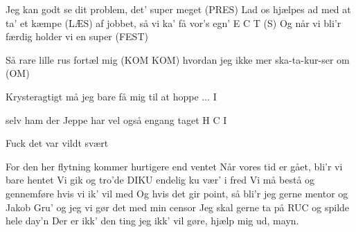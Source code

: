 \documentclass[a4paper,11pt]{article}
\begin{document}
\begin{song}
 Jeg kan godt se dit problem, det' super meget (PRES)
Lad os hjælpes ad med at ta' et kæmpe (LÆS)
af jobbet, så vi ka' få vor's egn' E C T (S)
Og når vi bli'r færdig holder vi en super (FEST)

 Så rare lille rus fortæl mig (KOM KOM)
hvordan jeg ikke mer ska-ta-kur-ser om (OM)

Krysteragtigt må jeg bare få mig til at hoppe ... I %

selv ham der Jeppe har vel også engang taget H C I

Fuck det var vildt svært

 For den her flytning kommer hurtigere end ventet
Når vores tid er gået, bli'r vi bare hentet
Vi gik og tro'de DIKU endelig ku vær' i fred
Vi må bestå og gennemføre hvis vi ik' vil med
 Og hvis det gir point, så bli'r jeg gerne mentor
og Jakob Gru' og jeg vi gør det med min censor
 Jeg skal gerne ta på RUC og spilde hele day'n
Der er ikk' den ting jeg ikk' vil gøre, hjælp mig ud, mayn.

\end{song}
\end{document}
